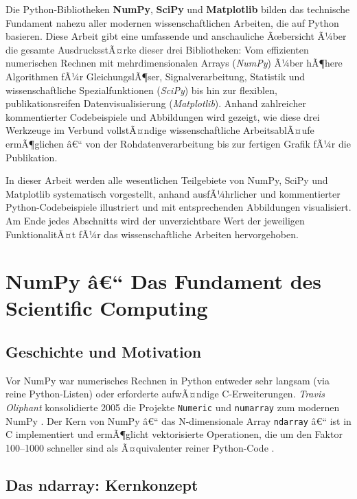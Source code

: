 \documentclass[12pt, a4paper]{article}
\begin{document}
Die Python-Bibliotheken \textbf{NumPy}, \textbf{SciPy} und \textbf{Matplotlib}
bilden das technische Fundament nahezu aller modernen wissenschaftlichen
Arbeiten, die auf Python basieren. Diese Arbeit gibt eine umfassende und
anschauliche Ãœbersicht Ã¼ber die gesamte AusdrucksstÃ¤rke dieser drei
Bibliotheken: Vom effizienten numerischen Rechnen mit mehrdimensionalen
Arrays (\emph{NumPy}) Ã¼ber hÃ¶here Algorithmen fÃ¼r GleichungslÃ¶ser,
Signalverarbeitung, Statistik und wissenschaftliche Spezialfunktionen
(\emph{SciPy}) bis hin zur flexiblen, publikationsreifen
Datenvisualisierung (\emph{Matplotlib}). Anhand zahlreicher kommentierter
Codebeispiele und Abbildungen wird gezeigt, wie diese drei Werkzeuge im
Verbund vollstÃ¤ndige wissenschaftliche ArbeitsablÃ¤ufe ermÃ¶glichen â€“
von der Rohdatenverarbeitung bis zur fertigen Grafik fÃ¼r die Publikation.

In dieser Arbeit werden alle wesentlichen Teilgebiete von NumPy, SciPy und
Matplotlib systematisch vorgestellt, anhand ausfÃ¼hrlicher und kommentierter
Python-Codebeispiele illustriert und mit entsprechenden Abbildungen
visualisiert. Am Ende jedes Abschnitts wird der unverzichtbare Wert der
jeweiligen FunktionalitÃ¤t fÃ¼r das wissenschaftliche Arbeiten hervorgehoben.


\section{NumPy â€“ Das Fundament des Scientific Computing}
\label{sec:numpy}

\subsection{Geschichte und Motivation}
\label{subsec:numpy-history}

Vor NumPy war numerisches Rechnen in Python entweder sehr langsam (via
reine Python-Listen) oder erforderte aufwÃ¤ndige C-Erweiterungen.
\emph{Travis Oliphant} konsolidierte 2005 die Projekte \texttt{Numeric}
und \texttt{numarray} zum modernen NumPy \cite{oliphant2006guide}.
Der Kern von NumPy â€“ das N-dimensionale Array \texttt{ndarray} â€“ ist in
C implementiert und ermÃ¶glicht vektorisierte Operationen, die um den
Faktor 100--1000 schneller sind als Ã¤quivalenter reiner Python-Code
\cite{harris2020array}.

\subsection{Das ndarray: Kernkonzept}
\label{subsec:numpy-ndarray}
\end{document}
